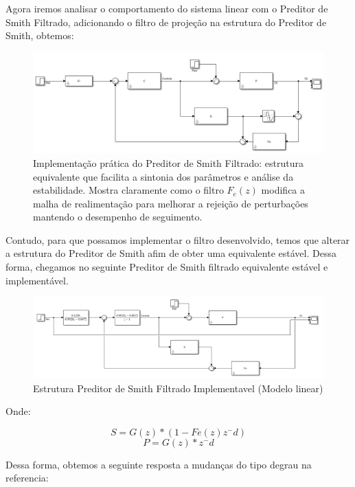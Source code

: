 \documentclass[a4paper,12pt]{article}
\begin{document}
Agora iremos analisar o comportamento do sistema linear com o Preditor de Smith Filtrado, adicionando o filtro de projeção na estrutura do Preditor de Smith, obtemos:

\begin{figure}[h]
    \centering
    \includegraphics[width=0.9\linewidth]{image2.png}
    \caption{Implementação prática do Preditor de Smith Filtrado: estrutura equivalente que facilita a sintonia dos parâmetros e análise da estabilidade. Mostra claramente como o filtro $F_e(z)$ modifica a malha de realimentação para melhorar a rejeição de perturbações mantendo o desempenho de seguimento.}
    \label{fig:enter-label}
\end{figure}

Contudo, para que possamos implementar o filtro desenvolvido, temos que alterar a estrutura do Preditor de Smith afim de obter uma equivalente estável. Dessa forma, chegamos no seguinte Preditor de Smith filtrado equivalente estável e implementável.

\begin{figure}[H]
    \centering
    \includegraphics[width=0.9\linewidth]{image3.png}
    \caption{Estrutura Preditor de Smith Filtrado Implementavel (Modelo linear)}
    \label{fig:enter-label}
\end{figure}

Onde:

\begin{equation}
S = G(z)*(1-Fe(z)z^-d)
\end{equation}
\begin{equation}
P = G(z)*z^-d
\end{equation}

Dessa forma, obtemos a seguinte resposta a mudanças do tipo degrau na referencia:
\end{document}
